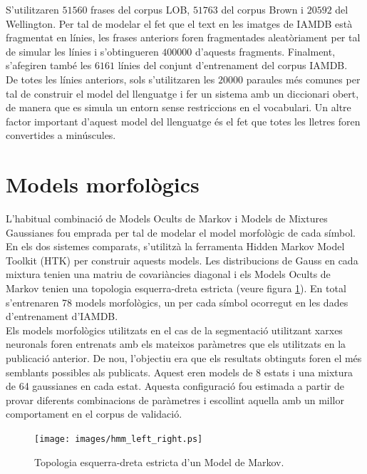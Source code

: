 S'utilitzaren $51560$ frases del corpus LOB, $51763$ del corpus Brown i $20592$ del Wellington. Per tal de modelar el fet que el text en les imatges de IAMDB està fragmentat en línies, les frases anteriors foren fragmentades aleatòriament per tal de simular les línies i s'obtingueren $400000$ d'aquests fragments. Finalment, s'afegiren també les $6161$ línies del conjunt d'entrenament del corpus IAMDB.\\

De totes les línies anteriors, sols s'utilitzaren les $20000$ paraules més comunes per tal de construir el model del llenguatge i fer un sistema amb un diccionari obert, de manera que es simula un entorn sense restriccions en el vocabulari. Un altre factor important d'aquest model del llenguatge és el fet que totes les lletres foren convertides a minúscules.

\section{Models morfològics}
L'habitual combinació de Models Ocults de Markov i Models de Mixtures Gaussianes fou emprada per tal de modelar el model morfològic de cada símbol. En els dos sistemes comparats, s'utilitzà la ferramenta Hidden Markov Model Toolkit (HTK) \cite{young1993htk} per construir aquests models. Les distribucions de Gauss en cada mixtura tenien una matriu de covariàncies diagonal i els Models Ocults de Markov tenien una topologia esquerra-dreta estricta (veure figura \ref{fig:hmm_left_right}). En total s'entrenaren 78 models morfològics, un per cada símbol ocorregut en les dades d'entrenament d'IAMDB.\\

Els models morfològics utilitzats en el cas de la segmentació utilitzant xarxes neuronals foren entrenats amb els mateixos paràmetres que els utilitzats en la publicació anterior. De nou, l'objectiu era que els resultats obtinguts foren el més semblants possibles als publicats. Aquest eren models de 8 estats i una mixtura de 64 gaussianes en cada estat. Aquesta configuració fou estimada a partir de provar diferents combinacions de paràmetres i escollint aquella amb un millor comportament en el corpus de validació.\\

\begin{figure}
\centering
\texttt{[image: images/hmm\_left\_right.ps]}
\caption{Topologia esquerra-dreta estricta d'un Model de Markov.}\label{fig:hmm_left_right}
\end{figure}

